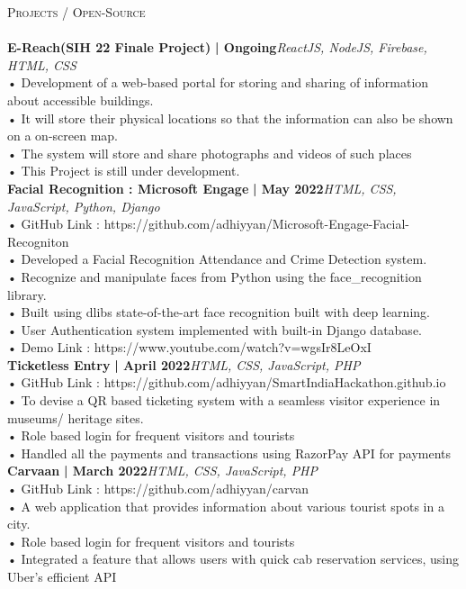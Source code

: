\documentclass[a4paper]{article}
\newcommand{\lineunder} {
    \vspace*{-8pt} \\
    \hspace*{-18pt} \hrulefill \\
}
\newcommand{\header} [1] {
    {\hspace*{-18pt}\vspace*{6pt} \textsc{#1}}
    \vspace*{-6pt} \lineunder
}
\begin{document}
      \header{Projects / Open-Source}
      \vspace{2mm}
      \vspace{3mm}
      {\textbf{E-Reach(SIH 22 Finale Project)}}\textbf{ | Ongoing}\hfill{\sl  ReactJS, NodeJS, Firebase, HTML, CSS }\\
            • Development of a web-based portal for storing and sharing of information about accessible buildings.\\
            • It will store their physical locations so that the information can also be shown on a on-screen map.\\
            • The system will store and share photographs and videos of such places\\
            • This Project is still under development.\\
          \vspace*{3mm}
      {\textbf{Facial Recognition : Microsoft Engage}}\textbf{ | May 2022}\hfill{\sl HTML, CSS, JavaScript, Python, Django}\\
• GitHub Link : https://github.com/adhiyyan/Microsoft-Engage-Facial-Recogniton\\
• Developed a Facial Recognition Attendance and Crime Detection system.\\
• Recognize and manipulate faces from Python using the face\_recognition library.\\
• Built using dlib\textquotesingle{}s state-of-the-art face recognition built with deep learning.\\
• User Authentication system implemented with built-in Django database.\\
• Demo Link : https://www.youtube.com/watch?v=wgsIr8LeOxI\\
          \vspace*{3mm}
          {\textbf{Ticketless Entry}}\textbf{ | April 2022}\hfill{\sl HTML, CSS, JavaScript, PHP}\\
          • GitHub Link : https://github.com/adhiyyan/SmartIndiaHackathon.github.io\\
• To devise a QR based ticketing system with a seamless visitor experience in museums/ heritage sites.\\
• Role based login for frequent visitors and tourists\\  • Handled all the payments and transactions using RazorPay API for payments\\ 
         \vspace*{3mm}
     {\textbf{Carvaan}}\textbf{ | March 2022}\hfill{\sl HTML, CSS, JavaScript, PHP}\\
          • GitHub Link : https://github.com/adhiyyan/carvan\\
• A web application that provides information about various tourist spots in a city.\\
•  Role based login for frequent visitors and tourists\\  • Integrated a feature that allows users with quick cab reservation services, using Uber's efficient API\\
         \vspace*{3mm}
\end{document}

